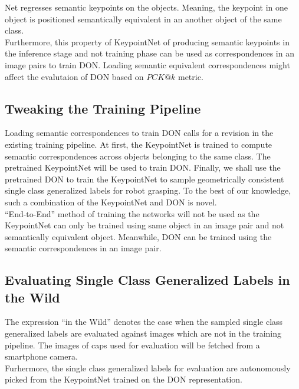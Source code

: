 Net regresses semantic keypoints on the objects. Meaning, the keypoint in one object is positioned semantically equivalent in an another object of the same class.\\

Furthermore, this property of KeypointNet of producing semantic keypoints in the inference stage and not training phase can be used as correspondences in an image pairs to train \ac{DON}.
Loading semantic equivalent correspondences might affect the evalutaion of \ac{DON} based on $PCK@k$ metric.\\


\subsection{Tweaking the Training Pipeline}

Loading semantic correspondences to train \ac{DON} calls for a revision in the existing training pipeline. At first, the KeypointNet is trained to compute semantic correspondences
across objects belonging to the same class. The pretrained KeypointNet will be used to train \ac{DON}. Finally, we shall use the pretrained \ac{DON} to train the KeypointNet to sample geometrically
consistent single class generalized labels for robot grasping.
To the best of our knowledge, such a combination of the KeypointNet and DON is novel. \\

``End-to-End'' method of training the networks will not be used as the KeypointNet can only be trained using same object in an image pair
and not semantically equivalent object. Meanwhile, \ac{DON} can be trained using the semantic correspondences in an image pair.


\subsection{Evaluating Single Class Generalized Labels in the Wild}

The expression ``in the Wild'' denotes the case when the sampled single class generalized labels are evaluated against images which are not in the training pipeline.
The images of caps used for evaluation will be fetched from a smartphone camera.\\

Furhermore, the single class generalized labels for evaluation are autonomously picked from the KeypointNet trained on the \ac{DON} representation.\\



